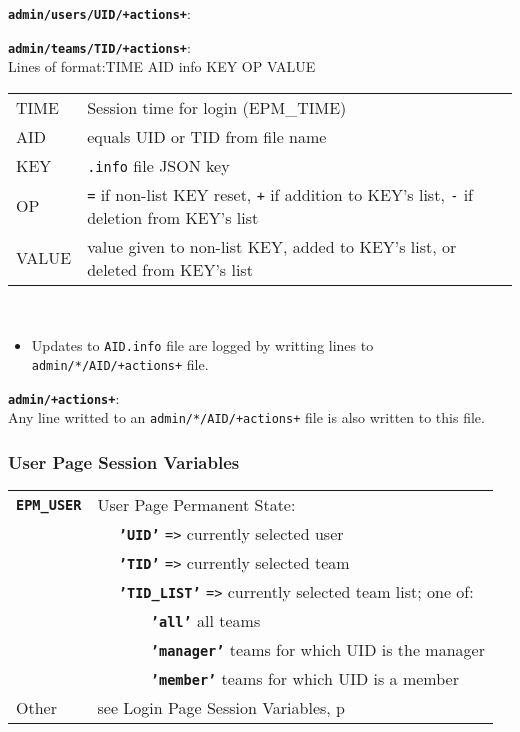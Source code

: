 \documentclass[12pt]{article}
\newenvironment{indpar}[1][0.4in]%
	{\begin{list}{}%
		     {\setlength{\itemsep}{0in}%
		      \setlength{\topsep}{0in}%
		      \setlength{\parsep}{1ex}%
		      \setlength{\labelwidth}{#1}%
		      \setlength{\leftmargin}{#1}%
		      \addtolength{\leftmargin}{\labelsep}}%
	 \item}%
	{\end{list}}
\newenvironment{itemlist}[1][0.2in]%
	{\begin{list}{}{\setlength{\labelwidth}{#1}%
		        \setlength{\leftmargin}{\labelwidth}%
		        \addtolength{\leftmargin}{+0.2in}%
		        \addtolength{\linewidth}{-\labelwidth}%
		        \addtolength{\linewidth}{-0.2in}%
		        \renewcommand{\makelabel}[1]{##1\hfill}}
	 \raggedright}%
	{\end{list}}
\newcommand{\TT}[1]{{\tt \bfseries #1}}
\newcommand{\pagref}[1]{p\pageref{#1}}
\begin{document}
\begin{indpar}
\begin{itemlist}
\item[\TT{admin/users/UID/+actions+}:]
\item[\TT{admin/teams/TID/+actions+}:]\vspace*{-1ex} ~
\label{ADMIN/XXXX/XID/ACTIONS} \\
Lines of format:\hspace{0.5in}TIME AID info KEY OP VALUE \\
\begin{tabular}[t]{@{\hspace{0.2in}}lp{3.9in}}
TIME & Session time for login (EPM\_TIME) \\
AID & equals UID or TID from file name \\
KEY & {\tt .info} file JSON key \\
OP & {\tt =} if non-list KEY reset, {\tt +} if addition to KEY's list,
     {\tt -} if deletion from KEY's list \\
VALUE & value given to non-list KEY, added to KEY's list,
        or deleted from KEY's list \\
\end{tabular}
\\
\begin{itemize}
\item Updates to {\tt AID.info} file are logged by writting lines
to {\tt admin/*/AID/+actions+} file.
\end{itemize}

\item[\TT{admin/+actions+}:] ~
\label{ADMIN/ACTIONS} \\
Any line writted to an {\tt admin/*/AID/+actions+} file is
also written to this file.

\end{itemlist}
\end{indpar}

\subsubsection{User Page Session Variables}

\begin{indpar}[0.2in]
\begin{tabular}[t]{lp{4.5in}}
\TT{EPM\_USER}\label{EPM_USER}
    & User Page Permanent State: \\
    & ~~ \TT{'UID'} {\tt =>} currently selected user \\
    & ~~ \TT{'TID'} {\tt =>} currently selected team \\
    & ~~ \TT{'TID\_LIST'} {\tt =>} currently selected team list; one of: \\
    & ~~~~~~ \TT{'all'} all teams \\
    & ~~~~~~ \TT{'manager'} teams for which UID is the manager \\
    & ~~~~~~ \TT{'member'} teams for which UID is a member
\\[1ex]
Other & see Login Page Session Variables, \pagref{LOGIN-PAGE-SESSION-VARIABLES}
\end{tabular}
\end{indpar}
\end{document}
